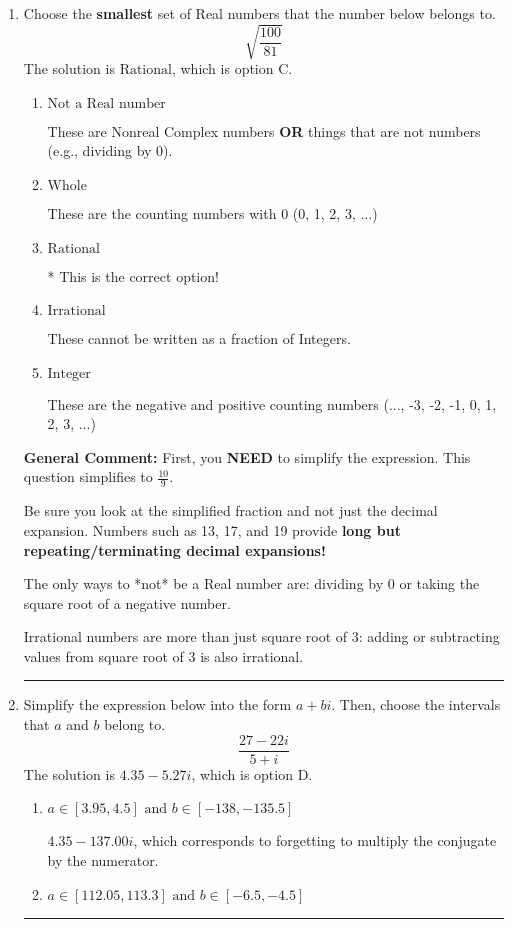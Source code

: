 \documentclass{extbook}[14pt]
\newcommand{\litem}[1]{\item #1

\rule{\textwidth}{0.4pt}}
\begin{document}
\begin{enumerate}
{ Irrational numbers are more than just square root of 3: adding or subtracting values from square root of 3 is also irrational.
}
\litem{
Choose the \textbf{smallest} set of Real numbers that the number below belongs to.
\[ \sqrt{\frac{100}{81}} \]The solution is \( \text{Rational} \), which is option C.\begin{enumerate}[label=\Alph*.]
\item \( \text{Not a Real number} \)

These are Nonreal Complex numbers \textbf{OR} things that are not numbers (e.g., dividing by 0).
\item \( \text{Whole} \)

These are the counting numbers with 0 (0, 1, 2, 3, ...)
\item \( \text{Rational} \)

* This is the correct option!
\item \( \text{Irrational} \)

These cannot be written as a fraction of Integers.
\item \( \text{Integer} \)

These are the negative and positive counting numbers (..., -3, -2, -1, 0, 1, 2, 3, ...)
\end{enumerate}

\textbf{General Comment:} First, you \textbf{NEED} to simplify the expression. This question simplifies to $\frac{10}{9}$. 
 
 Be sure you look at the simplified fraction and not just the decimal expansion. Numbers such as 13, 17, and 19 provide \textbf{long but repeating/terminating decimal expansions!} 
 
 The only ways to *not* be a Real number are: dividing by 0 or taking the square root of a negative number. 
 
 Irrational numbers are more than just square root of 3: adding or subtracting values from square root of 3 is also irrational.
}
\litem{
Simplify the expression below into the form $a+bi$. Then, choose the intervals that $a$ and $b$ belong to.
\[ \frac{27 - 22 i}{5 + i} \]The solution is \( 4.35  - 5.27 i \), which is option D.\begin{enumerate}[label=\Alph*.]
\item \( a \in [3.95, 4.5] \text{ and } b \in [-138, -135.5] \)

 $4.35  - 137.00 i$, which corresponds to forgetting to multiply the conjugate by the numerator.
\item \( a \in [112.05, 113.3] \text{ and } b \in [-6.5, -4.5] \)


\end{enumerate}}
\end{enumerate}
\end{document}
